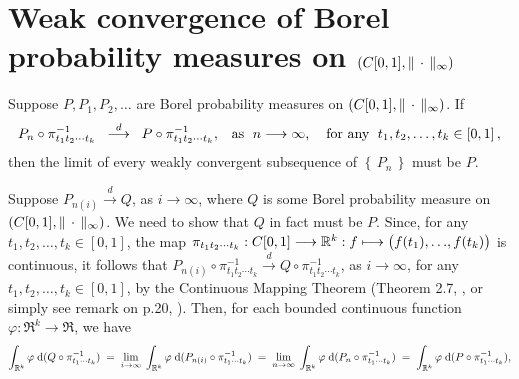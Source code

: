 

\section{Weak convergence of Borel probability measures on $\left(C[0,1],\Vert\,\cdot\,\Vert_{\infty}\right)$}
\setcounter{theorem}{0}
\setcounter{equation}{0}

\renewcommand{\theenumi}{\roman{enumi}}
\renewcommand{\labelenumi}{\textnormal{(\theenumi)}$\;\;$}

\begin{theorem}
\label{FiniteDimensionalDistributionsDetermineLimit}
\mbox{}\vskip 0.1cm
\noindent
Suppose $P, P_{1}, P_{2}, \ldots $ are Borel probability measures on $\left(C[0,1],\Vert\,\cdot\,\Vert_{\infty}\right)$.
If
\begin{equation*}
	P_{n}\circ\pi_{t_{1}t_{2}\cdots t_{k}}^{-1}
	\;\;\overset{d}{\longrightarrow}\;\;
	P\circ\pi_{t_{1}t_{2}\cdots t_{k}}^{-1},
	\;\;\;
	\textnormal{as \;$n \longrightarrow \infty$, \;\; for any \;$t_{1}, t_{2}, \ldots, t_{k} \in [0,1]$}\,,
\end{equation*}
then the limit of every weakly convergent subsequence of $\left\{\,P_{n}\,\right\}$ must be $P$.
\end{theorem}
\proof
Suppose $P_{n(i)} \overset{d}{\longrightarrow} Q$, as $i \longrightarrow \infty$, where $Q$ is some
Borel probability measure on $\left(C[0,1],\Vert\,\cdot\,\Vert_{\infty}\right)$.
We need to show that $Q$ in fact must be $P$.
Since, for any $t_{1}, t_{2}, \ldots, t_{k} \in [0,1]$, the map
$\pi_{t_{1}t_{2}\cdots t_{k}} : \Czo \longrightarrow \Re^{k} : f \longmapsto \left(f(t_{1}),\overset{{\color{white}1}}{\ldots},f(t_{k})\right)$ is continuous, it follows that
$P_{n(i)}\circ\pi_{t_{1}t_{2}\cdots t_{k}}^{-1} \overset{d}{\longrightarrow} Q\circ\pi_{t_{1}t_{2}\cdots t_{k}}^{-1}$,
as $i \longrightarrow \infty$, for any $t_{1}, t_{2}, \ldots, t_{k} \in [0,1]$, by the Continuous Mapping Theorem
(Theorem 2.7, \cite{Billingsley1999}, or simply see remark on p.20, \cite{Billingsley1999}).
Then, for each bounded continuous function $\varphi : \Re^{k} \longrightarrow \Re$, we have
\begin{equation*}
\int_{\mathbb{R}^{k}}\varphi\;\textnormal{d}(Q\circ\pi_{t_{1}\cdots t_{k}}^{-1})
\;=\; \underset{i\rightarrow\infty}{\lim}\;\int_{\mathbb{R}^{k}}\varphi\;\textnormal{d}(P_{n(i)}\circ\pi_{t_{1}\cdots t_{k}}^{-1})
\;=\; \underset{n\rightarrow\infty}{\lim}\;\int_{\mathbb{R}^{k}}\varphi\;\textnormal{d}(P_{n}\circ\pi_{t_{1}\cdots t_{k}}^{-1})
\;=\; \int_{\mathbb{R}^{k}}\varphi\;\textnormal{d}(P\circ\pi_{t_{1}\cdots t_{k}}^{-1}),
\end{equation*}
